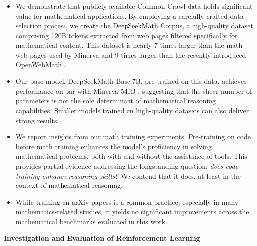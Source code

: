 \begin{itemize}[topsep=0pt]
    \item We demonstrate that publicly available Common Crawl data holds significant value for mathematical applications. By employing a carefully crafted data selection process, we create the DeepSeekMath Corpus, a high-quality dataset comprising 120B tokens extracted from web pages filtered specifically for mathematical content. This dataset is nearly 7 times larger than the math web pages used by Minerva \citep{minerva} and 9 times larger than the recently introduced OpenWebMath \citep{openwebmath}.

    \item Our base model, DeepSeekMath-Base 7B, pre-trained on this data, achieves performance on par with Minerva 540B \citep{minerva}, suggesting that the sheer number of parameters is not the sole determinant of mathematical reasoning capabilities. Smaller models trained on high-quality datasets can also deliver strong results.

    \item We report insights from our math training experiments. Pre-training on code before math training enhances the model’s proficiency in solving mathematical problems, both with and without the assistance of tools. This provides partial evidence addressing the longstanding question: \textit{does code training enhance reasoning skills?} We contend that it does, at least in the context of mathematical reasoning.

    \item While training on arXiv papers is a common practice, especially in many mathematics-related studies, it yields no significant improvements across the mathematical benchmarks evaluated in this work.
\end{itemize}

\textbf{Investigation and Evaluation of Reinforcement Learning}

